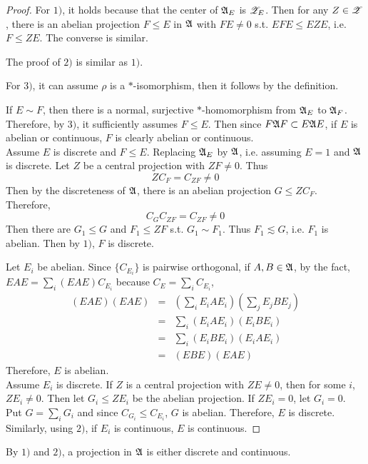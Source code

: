 \begin{proof}
	For $1)$, it holds because that the center of $\mathfrak{A}_E$ is $\mathscr{Z}_E$. Then for any $Z \in \mathscr{Z}$, there is an abelian projection $F \leqslant E$ in $\mathfrak{A}$ with $FE \neq 0$ s.t. $EFE \leqslant EZE$, i.e. $F \leqslant ZE$. The converse is similar.
	\item The proof of $2)$ is similar as $1)$.
	\item For $3)$, it can assume $\rho$ is a $*$-isomorphism, then it follows by the definition.
	\item If $E \sim F$, then there is a normal, surjective $*$-homomorphism from $\mathfrak{A}_E$ to $\mathfrak{A}_F$. Therefore, by $3)$, it sufficiently assumes $F \leqslant E$. Then since $F \mathfrak{A} F \subset E \mathfrak{A} E$, if $E$ is abelian or continuous, $F$ is clearly abelian or continuous. \\
	Assume $E$ is discrete and $F \leqslant E$. Replacing $\mathfrak{A}_E$ by $\mathfrak{A}$, i.e. assuming $E = 1$ and $\mathfrak{A}$ is discrete. Let $Z$ be a central projection with  $ZF \neq 0$. Thus
	\begin{equation*}
		ZC_F = C_{ZF} \neq 0
	\end{equation*}
	Then by the discreteness of $\mathfrak{A}$, there is an abelian projection $G \leqslant ZC_F$. Therefore, 
	\begin{equation*}
		C_G C_{ZF} = C_{ZF} \neq 0
	\end{equation*}
	Then there are $G_1 \leqslant G$ and $F_1 \leqslant ZF$ s.t. $G_1 \sim F_1$. Thus $F_1 \lesssim G$, i.e. $F_1$ is abelian. Then by $1)$, $F$ is discrete. 
	\item Let $E_i$ be abelian. Since $\{C_{E_i}\}$ is pairwise orthogonal, if $A, B \in \mathfrak{A}$, by the  fact, $EAE = \sum_i (EAE)C_{E_i}$ because $C_E = \sum_i C_{E_i}$,
	\begin{eqnarray*}
		(EAE)(EAE) &=& (\sum_i E_i A E_i)(\sum_j E_j B E_j) \\
		&=& \sum_i (E_i A E_i)(E_i B E_i) \\
		&=& \sum_i (E_i B E_i)(E_i A E_i) \\
		&=& (EBE)(EAE)
	\end{eqnarray*}
	Therefore, $E$ is abelian. \\
	Assume $E_i$ is discrete. If $Z$ is a central projection with $ZE \neq 0$, then for some $i$, $ZE_i \neq 0$. Then let $G_i \leqslant ZE_i$ be the abelian projection. If $ZE_i = 0$, let $G_i = 0$. Put $G = \sum_i G_i$ and since $C_{G_i} \leqslant C_{E_i}$, $G$ is abelian. Therefore, $E$ is discrete. Similarly, using $2)$, if $E_i$ is continuous, $E$ is continuous.
\end{proof}
\begin{rem}
	By $1)$ and $2)$, a projection in $\mathfrak{A}$ is either discrete and continuous.
\end{rem}

